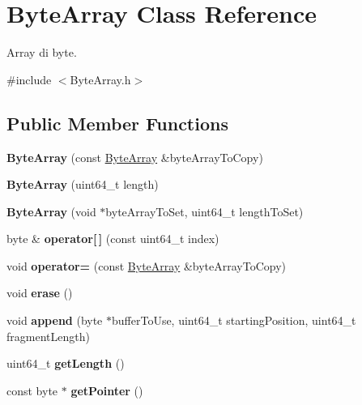 \hypertarget{class_byte_array}{
\section{ByteArray Class Reference}
\label{class_byte_array}
}


Array di byte.  




{\ttfamily \#include $<$ByteArray.h$>$}

\subsection*{Public Member Functions}
\begin{DoxyCompactItemize}
\item 
\hypertarget{class_byte_array_aab7cb5b65142fe11e91a777f1f4e3310}{
{\bfseries ByteArray} (const \hyperlink{class_byte_array}{ByteArray} \&byteArrayToCopy)}
\label{class_byte_array_aab7cb5b65142fe11e91a777f1f4e3310}

\item 
\hypertarget{class_byte_array_aa439bcb50a9c80e7eafdebb2873a7026}{
{\bfseries ByteArray} (uint64\_\-t length)}
\label{class_byte_array_aa439bcb50a9c80e7eafdebb2873a7026}

\item 
\hypertarget{class_byte_array_a919250f24f346ff4ab4fa1f47526529d}{
{\bfseries ByteArray} (void $\ast$byteArrayToSet, uint64\_\-t lengthToSet)}
\label{class_byte_array_a919250f24f346ff4ab4fa1f47526529d}

\item 
\hypertarget{class_byte_array_a87daa27628ec07ac06edd7928c3b7b0a}{
byte \& {\bfseries operator\mbox{[}$\,$\mbox{]}} (const uint64\_\-t index)}
\label{class_byte_array_a87daa27628ec07ac06edd7928c3b7b0a}

\item 
\hypertarget{class_byte_array_a38638aa69b25bde0afef8f3148bee6b9}{
void {\bfseries operator=} (const \hyperlink{class_byte_array}{ByteArray} \&byteArrayToCopy)}
\label{class_byte_array_a38638aa69b25bde0afef8f3148bee6b9}

\item 
\hypertarget{class_byte_array_a24c78a596b1284a2ddf73747cae01e61}{
void {\bfseries erase} ()}
\label{class_byte_array_a24c78a596b1284a2ddf73747cae01e61}

\item 
\hypertarget{class_byte_array_a0af33359304fadcb748259cf03c4f83f}{
void {\bfseries append} (byte $\ast$bufferToUse, uint64\_\-t startingPosition, uint64\_\-t fragmentLength)}
\label{class_byte_array_a0af33359304fadcb748259cf03c4f83f}

\item 
\hypertarget{class_byte_array_ac3d4c2580da7866375b1f3c5e2c4d8db}{
uint64\_\-t {\bfseries getLength} ()}
\label{class_byte_array_ac3d4c2580da7866375b1f3c5e2c4d8db}

\item 
\hypertarget{class_byte_array_adf8455c9ed69792d88dbd343452068aa}{
const byte $\ast$ {\bfseries getPointer} ()}
\label{class_byte_array_adf8455c9ed69792d88dbd343452068aa}

\end{DoxyCompactItemize}


